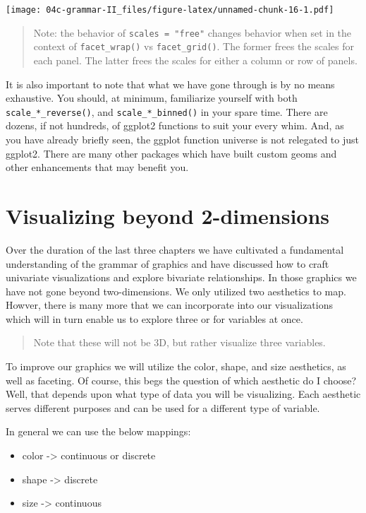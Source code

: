 \documentclass[
]{book}
\providecommand{\tightlist}{%
  \setlength{\itemsep}{0pt}\setlength{\parskip}{0pt}}
\begin{document}
\texttt{[image: 04c-grammar-II\_files/figure-latex/unnamed-chunk-16-1.pdf]}

\begin{quote}
Note: the behavior of \texttt{scales\ =\ "free"} changes behavior when set in the context of \texttt{facet\_wrap()} vs \texttt{facet\_grid()}. The former frees the scales for each panel. The latter frees the scales for either a column or row of panels.
\end{quote}

It is also important to note that what we have gone through is by no means exhaustive. You should, at minimum, familiarize yourself with both \texttt{scale\_*\_reverse()}, and \texttt{scale\_*\_binned()} in your spare time. There are dozens, if not hundreds, of ggplot2 functions to suit your every whim. And, as you have already briefly seen, the ggplot function universe is not relegated to just ggplot2. There are many other packages which have built custom geoms and other enhancements that may benefit you.

\hypertarget{visualizing-beyond-2-dimensions}{%
\chapter{Visualizing beyond 2-dimensions}\label{visualizing-beyond-2-dimensions}}

Over the duration of the last three chapters we have cultivated a fundamental understanding of the grammar of graphics and have discussed how to craft univariate visualizations and explore bivariate relationships. In those graphics we have not gone beyond two-dimensions. We only utilized two aesthetics to map. Howver, there is many more that we can incorporate into our visualizations which will in turn enable us to explore three or for variables at once.

\begin{quote}
Note that these will not be 3D, but rather visualize three variables.
\end{quote}

To improve our graphics we will utilize the color, shape, and size aesthetics, as well as faceting. Of course, this begs the question of which aesthetic do I choose? Well, that depends upon what type of data you will be visualizing. Each aesthetic serves different purposes and can be used for a different type of variable.

In general we can use the below mappings:

\begin{itemize}
\tightlist
\item
  color -\textgreater{} continuous or discrete
\item
  shape -\textgreater{} discrete
\item
  size -\textgreater{} continuous
\end{itemize}
\end{document}
